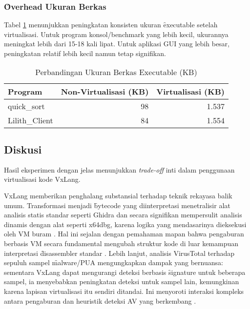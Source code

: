 \subsubsection{\f{Overhead} Ukuran Berkas}
Tabel \ref{tab:file_size_jurnal_ui_ana} menunjukkan peningkatan konsisten ukuran \f{executable} setelah virtualisasi. Untuk program konsol/benchmark yang lebih kecil, ukurannya meningkat lebih dari 15-18 kali lipat. Untuk aplikasi GUI yang lebih besar, peningkatan relatif lebih kecil namun tetap signifikan.
\begin{table}[H]
    \centering
    \caption{Perbandingan Ukuran Berkas Executable (KB)}
    \label{tab:file_size_jurnal_ui_ana}
    \fontsize{12}{12}\selectfont %
    \begin{tabular}{@{}lrr@{}}
        \toprule
        \textbf{Program}  & \textbf{Non-Virtualisasi (KB)} & \textbf{Virtualisasi (KB)} \\
        \midrule
        quick\_sort       & 98                            & 1.537                     \\
        Lilith\_Client    & 84                            & 1.554                     \\
        \bottomrule
    \end{tabular}
\end{table}

\subsection{Diskusi}
Hasil eksperimen dengan jelas menunjukkan \textit{trade-off} inti dalam penggunaan virtualisasi kode VxLang.

 VxLang memberikan penghalang substansial terhadap teknik rekayasa balik umum. Transformasi menjadi \f{bytecode} yang diinterpretasi menetralisir alat analisis statis standar seperti Ghidra \cite{Eilam2011, Ko2007} dan secara signifikan mempersulit analisis dinamis dengan alat seperti x64dbg, karena logika yang mendasarinya dieksekusi oleh VM buram \cite{Sikorski2012}. Hal ini sejalan dengan pemahaman mapan bahwa pengaburan berbasis VM secara fundamental mengubah struktur kode di luar kemampuan interpretasi \f{disassembler} standar \cite{Ore06, Salwan2018SymbolicDeobfuscation}. Lebih lanjut, analisis VirusTotal terhadap sepuluh sampel \f{malware}/PUA mengungkapkan dampak yang bernuansa: sementara VxLang dapat mengurangi deteksi berbasis \f{signature} untuk beberapa sampel, ia menyebabkan peningkatan deteksi untuk sampel lain, kemungkinan karena lapisan virtualisasi itu sendiri ditandai. Ini menyoroti interaksi kompleks antara pengaburan dan heuristik deteksi AV yang berkembang \cite{Ore06, Salwan2018SymbolicDeobfuscation, Rou13}.

